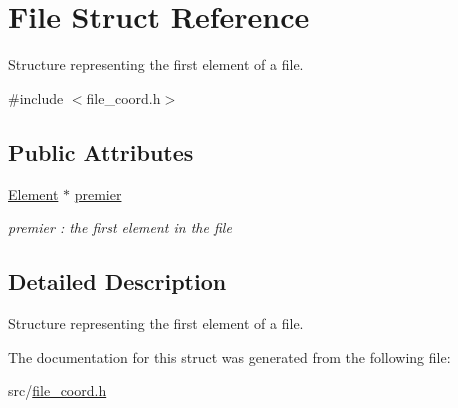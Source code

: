 \hypertarget{struct_file}{}\section{File Struct Reference}
\label{struct_file}


Structure representing the first element of a file.  




{\ttfamily \#include $<$file\+\_\+coord.\+h$>$}

\subsection*{Public Attributes}
\begin{DoxyCompactItemize}
\item 
\mbox{\label{struct_file_aea2cd6471c7d64c6f720c93b08012cc1}} 
\hyperlink{struct_element}{Element} $\ast$ \hyperlink{struct_file_aea2cd6471c7d64c6f720c93b08012cc1}{premier}
\begin{DoxyCompactList}\small\item\em premier \+: the first element in the file \end{DoxyCompactList}\end{DoxyCompactItemize}


\subsection{Detailed Description}
Structure representing the first element of a file. 

The documentation for this struct was generated from the following file\+:\begin{DoxyCompactItemize}
\item 
src/\hyperlink{file__coord_8h}{file\+\_\+coord.\+h}\end{DoxyCompactItemize}
